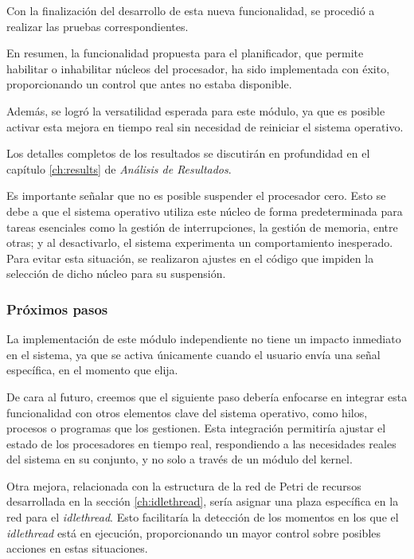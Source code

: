 Con la finalización del desarrollo de esta nueva funcionalidad, se procedió a realizar las pruebas correspondientes.\par

En resumen, la funcionalidad propuesta para el planificador, que permite habilitar o inhabilitar núcleos del procesador, ha sido implementada con éxito, proporcionando un control que antes no estaba disponible.\par

Además, se logró la versatilidad esperada para este módulo, ya que es posible activar esta mejora en tiempo real sin necesidad de reiniciar el sistema operativo.\par

Los detalles completos de los resultados se discutirán en profundidad en el capítulo \ref{ch:results} de \textit{Análisis de Resultados}.\par

Es importante señalar que no es posible suspender el procesador cero. Esto se debe a que el sistema operativo utiliza este núcleo de forma predeterminada para tareas esenciales como la gestión de interrupciones, la gestión de memoria, entre otras; y al desactivarlo, el sistema experimenta un comportamiento inesperado. Para evitar esta situación, se realizaron ajustes en el código que impiden la selección de dicho núcleo para su suspensión.\par

\subsubsection{Próximos pasos}

La implementación de este módulo independiente no tiene un impacto inmediato en el sistema, ya que se activa únicamente cuando el usuario envía una señal específica, en el momento que elija.\par

De cara al futuro, creemos que el siguiente paso debería enfocarse en integrar esta funcionalidad con otros elementos clave del sistema operativo, como hilos, procesos o programas que los gestionen. Esta integración permitiría ajustar el estado de los procesadores en tiempo real, respondiendo a las necesidades reales del sistema en su conjunto, y no solo a través de un módulo del kernel.\par

Otra mejora, relacionada con la estructura de la red de Petri de recursos desarrollada en la sección \ref{ch:idlethread}, sería asignar una plaza específica en la red para el \textit{idlethread}. Esto facilitaría la detección de los momentos en los que el \textit{idlethread} está en ejecución, proporcionando un mayor control sobre posibles acciones en estas situaciones.
